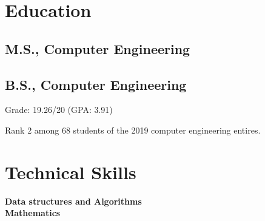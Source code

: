 \documentclass[letterpaper]{resume} %
\begin{document}
\begin{minipage}[t]{0.42\textwidth} %


\section{Education} 

\subsection{M.S., Computer Engineering}
\vspace{\topsep} %

\sectionspace %

\subsection{B.S., Computer Engineering}
\vspace{\topsep} %
\begin{tightitemize}
\item Grade: 19.26/20 (GPA: 3.91)
\item Rank 2 among 68 students of the 2019 computer engineering entires.
\end{tightitemize}

\sectionspace %


\section{Technical Skills}

{\bf Data structures and Algorithms} \\
{\bf Mathematics} \\

\sectionspace %


\end{minipage}
\end{document}
